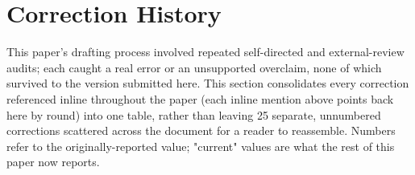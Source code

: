 \documentclass[onecolumn]{jmlr}
\begin{document}
\section{Correction History}
\label{sec:correction-history}

This paper's drafting process involved repeated self-directed and
external-review audits; each caught a real error or an unsupported
overclaim, none of which survived to the version submitted here. This
section consolidates every correction referenced inline throughout the
paper (each inline mention above points back here by round) into one
table, rather than leaving 25 separate, unnumbered corrections scattered
across the document for a reader to reassemble. Numbers refer to the
originally-reported value; "current" values are what the rest of this
paper now reports.
\end{document}
